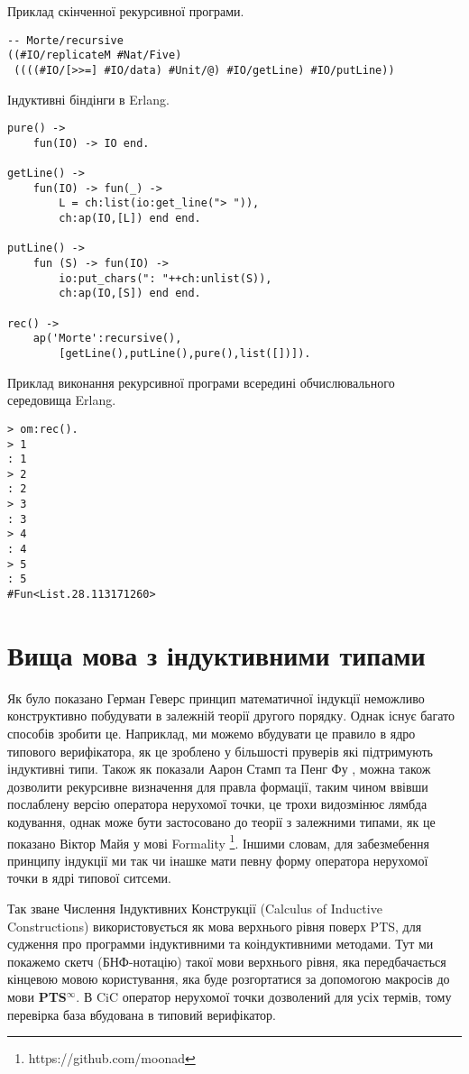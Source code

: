 \documentclass{article}
\begin{document}
Приклад скінченної рекурсивної програми.

\begin{lstlisting}[mathescape=true]
-- Morte/recursive
((#IO/replicateM #Nat/Five)
 ((((#IO/[>>=] #IO/data) #Unit/@) #IO/getLine) #IO/putLine))
\end{lstlisting}

Індуктивні біндінги в Erlang.

\begin{lstlisting}[mathescape=true]
pure() ->
    fun(IO) -> IO end.

getLine() ->
    fun(IO) -> fun(_) ->
        L = ch:list(io:get_line("> ")),
        ch:ap(IO,[L]) end end.

putLine() ->
    fun (S) -> fun(IO) ->
        io:put_chars(": "++ch:unlist(S)),
        ch:ap(IO,[S]) end end.

rec() ->
    ap('Morte':recursive(),
        [getLine(),putLine(),pure(),list([])]).
\end{lstlisting}

Приклад виконання рекурсивної програми всередині обчислювального середовища Erlang.

\begin{lstlisting}[mathescape=true]
> om:rec().
> 1
: 1
> 2
: 2
> 3
: 3
> 4
: 4
> 5
: 5
#Fun<List.28.113171260>
\end{lstlisting}

\section{Вища мова з індуктивними типами}
Як було показано Герман Геверс\cite{Geuvers01} принцип математичної індукції неможливо конструктивно
побудувати в залежній теорії другого порядку. Однак існує багато способів зробити це. Наприклад,
ми можемо вбудувати це правило в ядро типового верифікатора, як це зроблено у більшості пруверів які підтримують індуктивні типи.
Також як показали Аарон Стамп та Пенг Фу \cite{Stump17}, можна також дозволити рекурсивне визначення для правла формації, таким чином ввівши
послаблену версію оператора нерухомої точки, це трохи видозмінює лямбда кодування, однак може бути застосовано до теорії з
залежними типами, як це показано Віктор Майя у мові Formality \footnote{https://github.com/moonad}.
Іншими словам, для забезмебення принципу індукції ми так чи інашке мати певну форму оператора нерухомої точки в ядрі типової ситсеми.

Так зване Числення Індуктивних Конструкції (Calculus of Inductive Constructions\cite{Mohring15}) використовується як мова верхнього рівня
поверх PTS, для судження про программи індуктивними та коіндуктивними методами.
Тут ми покажемо скетч (БНФ-нотацію) такої мови верхнього рівня, яка передбачається кінцевою мовою користування,
яка буде розгортатися за допомогою макросів до мови \textbf{PTS$^\infty$}.
В CiC оператор нерухомої точки дозволений для усіх термів, тому перевірка база вбудована в типовий верифікатор.
\end{document}

